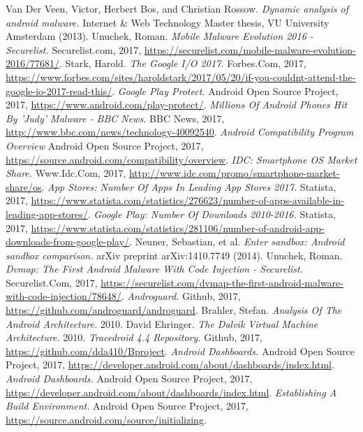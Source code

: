 \begin{thebibliography}{1}
 Van Der Veen, Victor, Herbert Bos, and Christian Rossow. {\em Dynamic analysis of android malware.} Internet \& Web Technology Master thesis, VU University Amsterdam (2013).
 Unuchek, Roman. {\em Mobile Malware Evolution 2016 - Securelist.} Securelist.com, 2017, \url{https://securelist.com/mobile-malware-evolution-2016/77681/}.
 Stark, Harold. {\em The Google I/O 2017.} Forbes.Com, 2017, \url{https://www.forbes.com/sites/haroldstark/2017/05/20/if-you-couldnt-attend-the-google-io-2017-read-this/}.
 {\em Google Play Protect.} Android Open Source Project, 2017, \url{https://www.android.com/play-protect/}. 
 {\em Millions Of Android Phones Hit By 'Judy' Malware - BBC News.} BBC News, 2017, \url{http://www.bbc.com/news/technology-40092540}.
 {\em Android Compatibility Program Overview} Android Open Source Project, 2017, \url{https://source.android.com/compatibility/overview}.
 {\em IDC: Smartphone OS Market Share.} Www.Idc.Com, 2017, \url{http://www.idc.com/promo/smartphone-market-share/os}.
 {\em App Stores: Number Of Apps In Leading App Stores 2017.} Statista, 2017, \url{https://www.statista.com/statistics/276623/number-of-apps-available-in-leading-app-stores/}.
 {\em Google Play: Number Of Downloads 2010-2016.} Statista, 2017, \url{https://www.statista.com/statistics/281106/number-of-android-app-downloads-from-google-play/}.
 Neuner, Sebastian, et al. {\em Enter sandbox: Android sandbox comparison.} arXiv preprint arXiv:1410.7749 (2014).
 Unuchek, Roman. {\em Dvmap: The First Android Malware With Code Injection - Securelist.} Securelist.Com, 2017, \url{https://securelist.com/dvmap-the-first-android-malware-with-code-injection/78648/}.
 {\em Androguard.} Github, 2017, \url{https://github.com/androguard/androguard}.
 Brahler, Stefan. {\em Analysis Of The Android Architecture.} 2010.
 David Ehringer. {\em The Dalvik Virtual Machine Architecture.} 2010. 
 {\em Tracedroid 4.4 Repository.} Github, 2017, \url{https://github.com/dda410/Bproject}.
 {\em Android Dashboards.} Android Open Source Project, 2017, \url{https://developer.android.com/about/dashboards/index.html}.
 {\em Android Dashboards.} Android Open Source Project, 2017, \url{https://developer.android.com/about/dashboards/index.html}.
 {\em Establishing A Build Environment.} Android Open Source Project, 2017, \url{https://source.android.com/source/initializing}.

\end{thebibliography}
